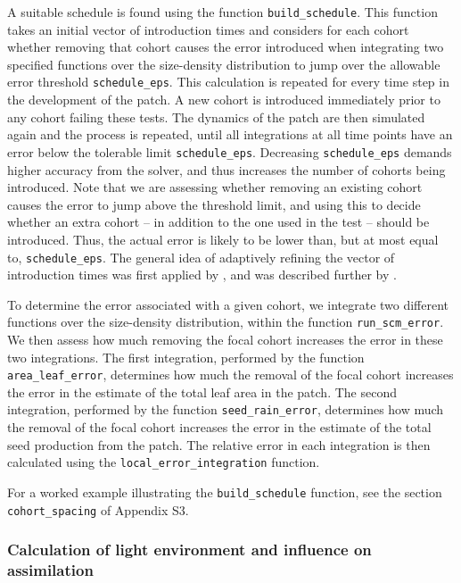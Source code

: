 \documentclass[10pt,twoside]{article}
\begin{document}
A suitable schedule is found using the function \texttt{build\_schedule}.
This function takes an
initial vector of introduction times and considers for each cohort
whether removing that cohort causes the error introduced when
integrating two specified functions over the size-density distribution to jump
over the allowable error threshold \texttt{schedule\_eps}. This
calculation is repeated for every time step in the development of the
patch. A new cohort is introduced immediately prior to any cohort
failing these tests. The dynamics of the patch are
then simulated again and the process is repeated, until all integrations at
all time points have an error below the tolerable limit
\texttt{schedule\_eps}. Decreasing \texttt{schedule\_eps} demands higher
accuracy from the solver, and thus increases the number of cohorts being
introduced. Note that we are assessing whether removing an existing cohort
causes the error to jump above the threshold limit, and using this to decide
whether an extra cohort -- in addition to the one used in the test --
should be introduced. Thus, the actual error is likely to
be lower than, but at most equal to, \texttt{schedule\_eps}. The general idea
of adaptively refining the vector of introduction times was first applied
by \citet{Falster-2011}, and was described further by \citet{Falster-2015}.

To determine the error associated with a given cohort, we integrate
two different functions over the size-density distribution, within the function
\texttt{run\_scm\_error}. We then assess how much removing the focal
cohort increases the error in these two integrations. The first
integration, performed by the function \texttt{area\_leaf\_error}, determines
how much the removal of the focal cohort increases the error in the
estimate of the total leaf area in the patch. The second integration,
performed by the function \texttt{seed\_rain\_error}, determines how much
the removal of the focal cohort increases the error in the estimate of the total seed
production from the patch. The relative error in each integration is then
calculated using the \texttt{local\_error\_integration} function.

For a worked example illustrating the \texttt{build\_schedule} function,
see the section \texttt{cohort\_spacing} of Appendix S3.

\subsubsection{Calculation of light environment and influence on
assimilation}\label{calculation-of-light-environment-and-influence-on-assimilation}
\end{document}
